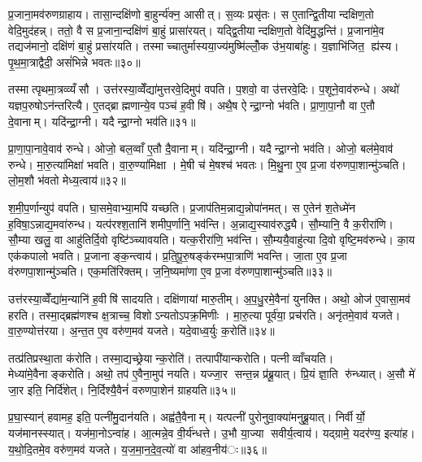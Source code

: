 प्र॒जाना॒मव॑रुणग्राहाय। तासा॒न्दक्षि॑णो बा॒हुर्न्य॑क्न॒ आसीत्। स॒व्यः प्रसृ॑तः। स ए॒तान्द्वि॒तीयान्दक्षिण॒तो वेदि॒मुद॑हन्न्। ततो॒ वै स प्र॒जाना॒न्दक्षि॑णं बा॒हुं प्रासा॑रयत्। यद्द्वि॒तीयान्दक्षिण॒तो वेदि॑मु॒द्धन्ति॑। प्र॒जाना॑मे॒व तद्यज॑मानो॒ दक्षि॑णं बा॒हुं प्रसा॑रयति। तस्माच्चातुर्मास्यया॒ज्य॑मुष्मि॑ल्लोँ॒क उ॑भ॒याबा॑हुः। य॒ज्ञाभि॑जित॒ ह्य॑स्य। पृ॒थ॒मा॒त्राद्वैदी॒ असं॑भिन्ने भवतः॥३०॥

तस्मात्पृथमा॒त्रव्व्यँसौ। उत्त॑रस्या॒व्वेँद्या॑मुत्तरवे॒दिमुप॑ वपति। प॒शवो॒ वा उ॑त्तरवे॒दिः। प॒शूने॒वाव॑रुन्धे। अथो॑ यज्ञप॒रुषोऽन॑न्तरित्यै। ए॒तद्ब्राह्मणान्ये॒व पञ्च॑ ह॒वीषि॑। अथै॒ष ऐन्द्रा॒ग्नो भ॑वति। प्रा॒णा॒पा॒नौ वा ए॒तौ दे॒वानाम्। यदि॑न्द्रा॒ग्नी। यदैन्द्रा॒ग्नो भव॑ति॥३१॥

प्रा॒णा॒पा॒नावे॒वाव॑ रुन्धे। ओजो॒ बल॒व्वाँ ए॒तौ दै॒वानाम्। यदि॑न्द्रा॒ग्नी। यदैन्द्रा॒ग्नो भव॑ति। ओजो॒ बल॑मे॒वाव॑ रुन्धे। मा॒रु॒त्या॑मिक्षा॑ भवति। वा॒रु॒ण्या॑मिक्षा। मे॒षी च॑ मे॒षश्च॑ भवतः। मि॒थु॒ना ए॒व प्र॒जा व॑रुणपा॒शान्मु॑ञ्चति। लो॒म॒शौ भ॑वतो मेध्य॒त्वाय॑॥३२॥

श॒मी॒प॒र्णान्युप॑ वपति। घा॒समे॒वाभ्या॒मपि॑ यच्छति। प्र॒जाप॑तिम॒न्नाद्य॒न्नोपा॑नमत्। स ए॒तेन॑ श॒तेध्मे॑न ह॒विषा॒ऽन्नाद्य॒मवा॑रुन्ध। यत्प॑रश्श॒तानि॑ शमीप॒र्णानि॒ भव॑न्ति। अ॒न्नाद्य॒स्याव॑रुद्ध्यै। सौ॒म्यानि॒ वै क॒रीरा॑णि। सौ॒म्या खलु॒ वा आहु॑तिर्दि॒वो वृष्टि॑ञ्च्यावयति। यत्क॒रीरा॑णि॒ भव॑न्ति। सौ॒म्ययै॒वाहु॑त्या दि॒वो वृष्टि॒मव॑रुन्धे। का॒य एक॑कपालो भवति। प्र॒जानाङ्क॒न्त्वाय॑। प्र॒ति॒पू॒रु॒षङ्क॑रम्भपा॒त्राणि॑ भवन्ति। जा॒ता ए॒व प्र॒जा व॑रुणपा॒शान्मु॑ञ्चति। एक॒मति॑रिक्तम्। ज॒नि॒ष्यमा॑णा ए॒व प्र॒जा व॑रुणपा॒शान्मु॑ञ्चति॥३३॥


उत्त॑रस्या॒व्वेँद्या॑म॒न्यानि॑ ह॒वीषि॑ सादयति। दक्षि॑णायां मारु॒तीम्। अ॒प॒धु॒रमे॒वैना॑ युनक्ति। अथो॒ ओज॑ ए॒वासा॒मव॑ हरति। तस्मा॒द्ब्रह्म॑णश्च क्ष॒त्राच्च॒ विशोऽन्यतोऽपक्र॒मिणीः। मा॒रु॒त्या पूर्व॑या॒ प्रच॑रति। अनृ॑तमे॒वाव॑ यजते। वा॒रु॒ण्योत्त॑रया। अ॒न्त॒त ए॒व वरु॑ण॒मव॑ यजते। यदे॒वाध्व॒र्युः क॒रोति॑॥३४॥

तत्प्र॑तिप्रस्था॒ता क॑रोति। तस्मा॒द्यच्छ्रेयान्क॒रोति॑। तत्पापी॑यान्करोति। पत्नीव्वाँचयति। मेध्या॑मे॒वैनाङ्करोति। अथो॒ तप॑ ए॒वैना॒मुप॑ नयति। यज्जा॒र सन्त॒न्न प्र॑ब्रू॒यात्। प्रि॒यं ज्ञा॒ति रु॑न्ध्यात्। अ॒सौ मे॑ जा॒र इति॒ निर्दि॑शेत्। नि॒र्दिश्यै॒वैनं॑ वरुणपा॒शेन॑ ग्राहयति॥३५॥

प्र॒घा॒स्यान्॑ हवामह॒ इति॒ पत्नी॑मु॒दान॑यति। अह्व॑तै॒वैनाम्। यत्पत्नी॑ पुरोनुवा॒क्या॑मनुब्रू॒यात्। निर्वीर्यो॒ यज॑मानस्स्यात्। यज॑मा॒नोऽन्वा॑ह। आ॒त्मन्ने॒व वी॒र्य॑न्धत्ते। उ॒भौ या॒ज्या सवीर्य॒त्वाय॑। यद्ग्रामे॒ यदर॑ण्य॒ इत्या॑ह। य॒थो॒दि॒तमे॒व वरु॑ण॒मव॑ यजते। य॒ज॒मा॒न॒दे॒व॒त्यो॑ वा आ॑हव॒नीय॑ः॥३६॥


